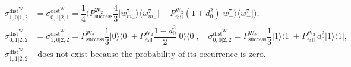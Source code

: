 \documentclass[reprint,superscriptaddress,nofootinbib,amsmath,amssymb,aps,pra,longbibliography]{revtex4-1}
\begin{document}
\begin{widetext}
\begin{align}
     \sigma_{1,0|1,2}^{\text{dist}^{\text{W}}} &= \sigma_{0,1|2,1}^{\text{dist}^{\text{W}}} = \dfrac{1}{4} \Bigg( P_{\text{success}}^{\text{W}_2} \dfrac{4}{3} \Big| w_{m_{-}}^7 \Big\rangle \Big\langle w_{m_{-}}^7 \Bigg| + P_{\text{fail}}^{\text{W}_2} (1+d_0^2) \Big| w_{-}^7 \Big\rangle \Big\langle w_{-}^7 \Big| \Bigg), \nonumber \\
      \sigma_{0,1|2,2}^{\text{dist}^{\text{W}}} &= \sigma_{1,0|2,2}^{\text{dist}^{\text{W}}} = P_{\text{success}}^{\text{W}_2} \dfrac{1}{3} \Big| 0 \Big\rangle \Big\langle 0 \Big|  + P_{\text{fail}}^{\text{W}_2} \dfrac{1-d_0^2}{2} \Big| 0 \Big\rangle \Big\langle 0 \Big| , \quad  \sigma_{0,0|2,2}^{\text{dist}^{\text{W}}} = P_{\text{success}}^{\text{W}_2} \dfrac{1}{3} \Big| 1 \Big\rangle \Big\langle 1 \Big|  + P_{\text{fail}}^{\text{W}_2} \, d_0^2 \Big| 1 \Big\rangle \Big\langle 1 \Big|, \nonumber \\
       \sigma_{1,1|2,2}^{\text{dist}^{\text{W}}}  & \, \, \text{does not exist because the probability of its occurrence is zero.}
	\label{W2Sdistassemblage}
\end{align}


\end{widetext}
\end{document}
